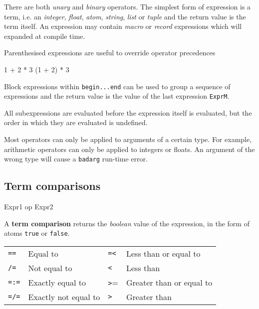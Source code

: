 There are both \textit{unary} and \textit{binary} operators. The
simplest form of expression is a term, i.e. an \textit{integer},
\textit{float}, \textit{atom}, \textit{string}, \textit{list} or
\textit{tuple} and the return value is the term itself. An expression
may contain \textit{macro} or \textit{record} expressions which will
expanded at compile time.

Parenthesised expressions are useful to override operator precedences

\begin{erlang}
1 + 2 * 3           %
(1 + 2) * 3         %
\end{erlang}

Block expressions within \texttt{begin...end} can be used to group a
sequence of expressions and the return value is the value of the last
expression \texttt{ExprM}.

All subexpressions are evaluated before the expression itself is
evaluated, but the order in which they are evaluated is undefined.

Most operators can only be applied to arguments of a certain type. For
example, arithmetic operators can only be applied to integers or
floats. An argument of the wrong type will cause a \texttt{badarg}
run-time error.


\subsection{Term comparisons}
\begin{erlang}
Expr1 op Expr2
\end{erlang}

A \textbf{term comparison} returns the \textit{boolean} value of the
expression, in the form of atoms \texttt{true} or \texttt{false}.

\begin{center}
\begin{tabular}{|>{\raggedright}p{40pt}|>{\raggedright}p{105pt}|>{\raggedright}p{26pt}|>{\raggedright}p{124pt}|}
\hline
\multicolumn{4}{|p{297pt}|}{Comparison operators}\tabularnewline
\hline
\texttt{==} & Equal to & \texttt{=<} & Less than or equal to\tabularnewline
\hline
\texttt{/=} & Not equal to & \texttt{<} & Less than\tabularnewline
\hline
\texttt{=:=} & Exactly equal to & \texttt{>}= & Greater than or equal to\tabularnewline
\hline
\texttt{=/=} & Exactly not equal to & \texttt{>} & Greater than\tabularnewline
\hline
\end{tabular}
\end{center}

